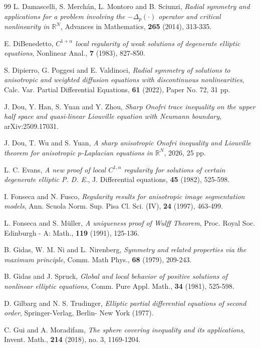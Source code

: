 \documentclass[12pt]{amsart}
\theoremstyle{definition}
\theoremstyle{remark}
\theoremstyle{conclusion}
\theoremstyle{conjecture}
\numberwithin{equation}{section}
\begin{document}
\begin{thebibliography}{99}
 L. Damascelli, S. Merch\'{a}n, L. Montoro and B. Sciunzi, {\it Radial symmetry and applications for a problem involving the $-\Delta_p(\cdot)$ operator and critical nonlinearity in $\mathbb{R}^N$}, Advances in Mathematics, \textbf{265} (2014), 313-335.

 E. DiBenedetto, {\it $C^{1+\alpha}$ local regularity of weak solutions of degenerate elliptic equations}, Nonlinear Anal., \textbf{7} (1983), 827-850.

 S. Dipierro, G. Poggesi and E. Valdinoci, {\it Radial symmetry of solutions to anisotropic and weighted diffusion equations with discontinuous nonlinearities}, Calc. Var. Partial Differential Equations, \textbf{61} (2022), Paper No. 72, 31 pp.

 J. Dou, Y. Han, S. Yuan and Y. Zhou, {\it Sharp Onofri trace inequality on the upper half space and quasi-linear Liouville equation with Neumann boundary}, arXiv:2509.17031.

 J. Dou, T. Wu and S. Yuan, {\it A sharp anisotropic Onofri inequality and Liouville theorem for anisotropic $p$-Laplacian equations in $\mathbb{R}^{N}$}, 2026, 25 pp.

 L. C. Evans, {\it A new proof of local $C^{1,\alpha}$ regularity for solutions of certain degenerate elliptic P. D. E.}, J. Differential equations, \textbf{45} (1982), 525-598.

 I. Fonseca and N. Fusco, {\it Regularity results for anisotropic image segmentation models}, Ann. Scuola Norm. Sup. Pisa Cl. Sci. (IV), \textbf{24} (1997), 463-499.

 L. Fonseca and S. M\"{u}ller, {\it A uniqueness proof of Wulff Theorem}, Proc. Royal Soc. Edinburgh - A: Math., \textbf{119} (1991), 125-136.

 B. Gidas, W. M. Ni and L. Nirenberg, {\it Symmetry and related properties via the maximum principle}, Comm. Math Phys., \textbf{68} (1979), 209-243.

 B. Gidas and J. Spruck, {\it Global and local behavior of positive solutions of nonlinear elliptic equations}, Comm. Pure Appl. Math., \textbf{34} (1981), 525-598.

 D. Gilbarg and N. S. Trudinger, {\it Elliptic partial differential equations of second order}, Springer-Verlag, Berlin- New York (1977).

 C. Gui and A. Moradifam, {\it The sphere covering inequality and its applications}, Invent. Math., \textbf{214} (2018), no. 3, 1169-1204.


\end{thebibliography}
\end{document}

